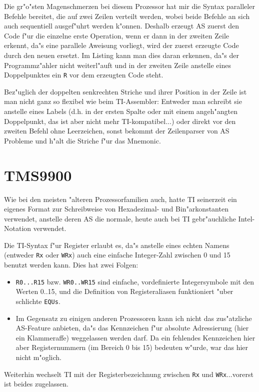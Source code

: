 \documentclass[12pt,a4paper,twoside]{report}
\newcommand{\tty}[1]{{\tt #1}}
\begin{document}
Die gr"o"sten Magenschmerzen bei diesem Prozessor hat mir die Syntax
paralleler Befehle bereitet, die auf zwei Zeilen verteilt werden,
wobei beide Befehle an sich auch sequentiell ausgef"uhrt werden k"onnen.
Deshalb erzeugt AS zuerst den Code f"ur die einzelne erste Operation,
wenn er dann in der zweiten Zeile erkennt, da"s eine parallele Aweisung
vorliegt, wird der zuerst erzeugte Code durch den neuen ersetzt.
Im Listing kann man dies daran erkennen, da"s der Programmz"ahler
nicht weiterl"auft und in der zweiten Zeile anstelle eines Doppelpunktes
ein \tty{R} vor dem erzeugten Code steht.
\par
Bez"uglich der doppelten senkrechten Striche und ihrer Position in der
Zeile ist man nicht ganz so flexibel wie beim TI-Assembler: Entweder
man schreibt sie anstelle eines Labels (d.h. in der ersten Spalte oder
mit einem angeh"angten Doppelpunkt, das ist aber nicht mehr
TI-kompatibel...) oder direkt vor den zweiten Befehl ohne Leerzeichen,
sonst bekommt der Zeilenparser von AS Probleme und h"alt die Striche
f"ur das Mnemonic.


\section{TMS9900}

Wie bei den meisten "alteren Prozessorfamilien auch, hatte TI seinerzeit
ein eigenes Format zur Schreibweise von Hexadezimal- und Bin"arkonstanten
verwendet, anstelle deren AS die normale, heute auch bei TI
gebr"auchliche Intel-Notation verwendet.

Die TI-Syntax f"ur Register erlaubt es, da"s anstelle eines echten Namens
(entweder \tty{Rx} oder \tty{WRx}) auch eine einfache Integer-Zahl
zwischen 0 und 15 benutzt werden kann.  Dies hat zwei Folgen:
\begin{itemize}
\item{\tty{R0...R15} bzw. \tty{WR0..WR15} sind einfache, vordefinierte
      Integersymbole mit den Werten 0..15, und die Definition von
      Registeraliasen funktioniert "uber schlichte \tty{EQUs}.}
\item{Im Gegensatz zu einigen anderen Prozessoren kann ich nicht das
      zus"atzliche AS-Feature anbieten, da"s das Kennzeichen f"ur
      absolute Adressierung (hier ein Klammeraffe) weggelassen werden
      darf.  Da ein fehlendes Kennzeichen hier aber Registernummern (im
      Bereich 0 bis 15) bedeuten w"urde, war das hier nicht m"oglich.}
\end{itemize}
Weiterhin wechselt TI mit der Registerbezeichnung zwischen \tty{Rx} und
\tty{WRx}...vorerst ist beides zugelassen.
\end{document}
